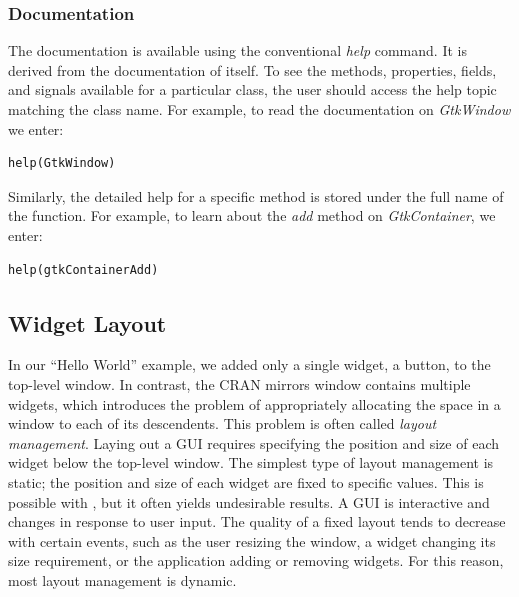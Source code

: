 \documentclass[article]{jss}
\begin{document}
\subsubsection{Documentation}

The  documentation is available using the conventional  
\emph{help} command. It is derived from the documentation of  itself.
To see the methods, properties, fields, and signals available
for a particular class, the user should access the help topic matching the class name.
For example, to read the documentation on \emph{GtkWindow} we enter:
\begin{verbatim}
help(GtkWindow)
\end{verbatim}

Similarly, the detailed help for a specific method is stored under the full
name of the function. For example, to learn about the \emph{add} method on
\emph{GtkContainer}, we enter:
\begin{verbatim}
help(gtkContainerAdd)
\end{verbatim}

\subsection{Widget Layout}\label{sec:layout}

In our ``Hello World'' example, we added only a single widget, a button, to the 
top-level window. In contrast, the CRAN mirrors window contains multiple 
widgets, which introduces the problem of appropriately allocating the space in a
window to each of its descendents. This problem is often called \emph{layout management}.
Laying out a GUI requires specifying the position and size of each widget below
the top-level window. The simplest type of layout management is static; the
position and size of each widget are fixed to specific values. This is possible
with , but it often yields undesirable results. A GUI is interactive 
and changes in response to user input. The quality of a fixed layout tends to decrease
with certain events, such as the user resizing
the window, a widget changing its size requirement, or the application
adding or removing widgets. For this reason, most layout management is dynamic.
\end{document}
